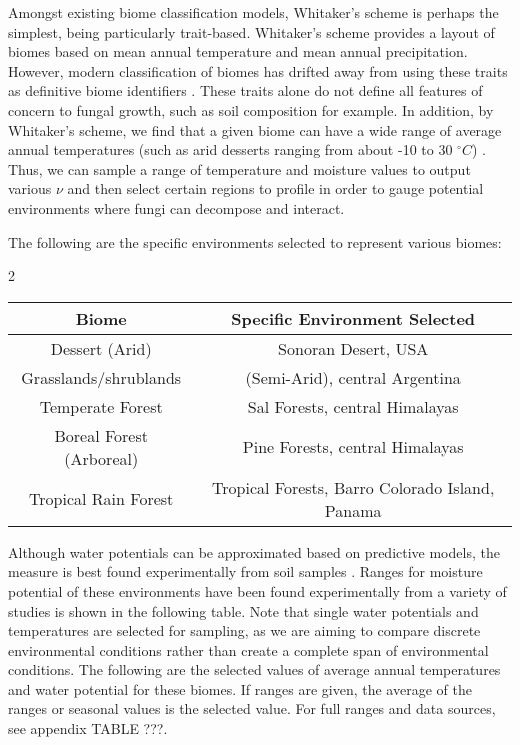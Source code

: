 \documentclass[12pt]{article}
\begin{document}
\begin{multicols}{2}
Amongst existing biome classification models, Whitaker's scheme \cite{Whittaker1970} is perhaps the simplest, being particularly trait-based. Whitaker's scheme provides a layout of biomes based on mean annual temperature and mean annual precipitation. However, modern classification of biomes has drifted away from using these traits as definitive biome identifiers \cite{Mucina2018}. These traits alone do not define all features of concern to fungal growth, such as soil composition for example. In addition, by Whitaker's scheme, we find that a given biome can have a wide range of average annual temperatures (such as arid desserts ranging from about -10 to 30 $^{\circ}C$) \cite{Whittaker1970}. Thus, we can sample a range of temperature and moisture values to output various $\nu$ and then select certain regions to profile in order to gauge potential environments where fungi can decompose and interact.

The following are the specific environments selected to represent various biomes:

\end{multicols}{2}

\begin{savenotes}
	\begin{table}[H]
		\begin{center}
			\begin{tabular}{|c c|} 
				\hline
				Biome & Specific Environment Selected \\ [0.5ex] 
				\hline\hline
				Dessert (Arid) & Sonoran Desert, USA \\ 
				\hline
				Grasslands/shrublands & (Semi-Arid), central Argentina\\
				\hline
				Temperate Forest & Sal Forests, central Himalayas\\
				\hline
				Boreal Forest (Arboreal) & Pine Forests, central Himalayas\\
				\hline
				Tropical Rain Forest & Tropical Forests, Barro Colorado Island, Panama \\
				\hline
			\end{tabular}
		\end{center}
	\end{table}
\end{savenotes}

Although water potentials can be approximated based on predictive models, the measure is best found experimentally from soil samples \cite{Abkenar2019}. Ranges for moisture potential of these environments have been found experimentally from a variety of studies is shown in the following table. Note that single water potentials and temperatures are selected for sampling, as we are aiming to compare discrete environmental conditions rather than create a complete span of environmental conditions. The following are the selected values of average annual temperatures and water potential for these biomes. If ranges are given, the average of the ranges or seasonal values is the selected value. For full ranges and data sources, see appendix TABLE ???.
\end{document}
